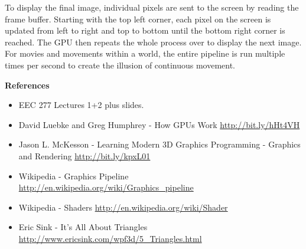\documentclass[12pt] {article}
\begin{document}
To display the final image, individual pixels are sent to the screen by reading the frame buffer. Starting with the top left corner, each pixel on the screen is updated from left to right and top to bottom until the bottom right corner is reached. The GPU then repeats the whole process over to display the next image. For movies and movements within a world, the entire pipeline is run multiple times per second to create the illusion of continuous movement.


\clearpage
\large \bf {References}
\medskip

\normalsize
\begin{itemize}
	
	\item EEC 277 Lectures 1+2 plus slides.
	
	\item David Luebke and Greg Humphrey - How GPUs Work \newline
	\url {http://bit.ly/hHt4VH}
		
	\item Jason L. McKesson - Learning Modern 3D Graphics Programming - Graphics and Rendering \newline
	\url {http://bit.ly/kpxL01}
		
	\item Wikipedia - Graphics Pipeline \newline
	\url {http://en.wikipedia.org/wiki/Graphics_pipeline}
	
	\item Wikipedia - Shaders \newline
	\url {http://en.wikipedia.org/wiki/Shader}
	
	\item Eric Sink - It's All About Triangles \newline
	\url {http://www.ericsink.com/wpf3d/5_Triangles.html}	
\end{itemize}
\end{document}
